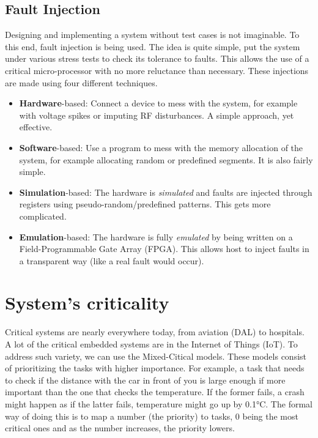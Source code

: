 \documentclass[11pt,a4paper]{report}
\begin{document}
\subsection{Fault Injection}
Designing and implementing a system without test cases is not imaginable. 
To this end, fault injection is being used. The idea is quite simple, put the system under various stress tests to check its tolerance to faults. 
This allows the use of a critical micro-processor with no more reluctance than necessary. 
These injections are made using four different techniques\cite{diversification-obfuscation, future-research}.
\begin{itemize}
    \item \textbf{Hardware}-based: Connect a device to mess with the system, for example with voltage spikes or imputing RF disturbances. A simple approach, yet effective. 
    \item \textbf{Software}-based: Use a program to mess with the memory allocation of the system, for example allocating random or predefined segments. It is also fairly simple. 
    \item \textbf{Simulation}-based: The hardware is \textit{simulated} and faults are injected through registers using pseudo-random/predefined patterns. This gets more complicated.
    \item \textbf{Emulation}-based: The hardware is fully \textit{emulated} by being written on a Field-Programmable Gate Array (FPGA). This allows host to inject faults in a transparent way (like a real fault would occur). 
\end{itemize}


\section{System's criticality}
Critical systems are nearly everywhere today, from aviation \cite{avion-fault-timing-multi} (DAL) to hospitals. 
A lot of the critical embedded systems are in the Internet of Things (IoT). 
To address such variety, we can use the Mixed-Citical models. 
These models consist of prioritizing the tasks with higher importance. 
For example, a task that needs to check if the distance with the car in front of you is large enough if more important than the one that checks the temperature. 
If the former fails, a crash might happen as if the latter fails, temperature might go up by 0.1°C. 
The formal way of doing this is to map a number (the priority) to tasks, 0 being the most critical ones and as the number increases, the priority lowers. \\
\end{document}
